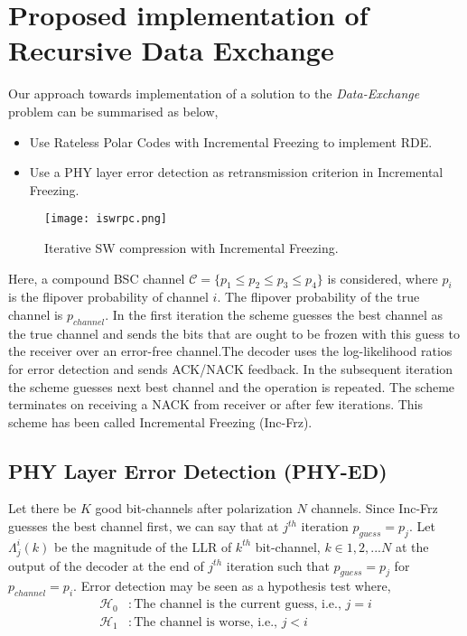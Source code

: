\documentclass[
11pt, %
a4paper, %
oneside, %
headinclude,footinclude, %
BCOR5mm, %
]{scrartcl}
\begin{document}
\section*{Proposed implementation of Recursive Data Exchange} \label{propsol}
Our approach towards implementation of a solution to the \emph{Data-Exchange} problem can be summarised as below, 
\begin{itemize}
\item{Use Rateless Polar Codes with Incremental Freezing to implement RDE.}
\item{Use a PHY layer error detection as retransmission criterion in Incremental Freezing.}
\end{itemize}
\begin{figure}[h]
 \begin{center}
    \texttt{[image: iswrpc.png]}
  \end{center}
  \caption{Iterative SW compression with Incremental Freezing.}
  \label{fig:iswrpc}
\end{figure} 
Here, a compound BSC channel $\mathcal{C}=\{ p_1 \leq p_2 \leq p_3 \leq p_4\}$ is considered, where $p_i$ is the flipover probability of channel $i$. The flipover probability of the true channel is $p_{channel}$.
In the first iteration the scheme guesses the best channel as the true channel and sends the bits that are ought to be frozen with this guess to the receiver over an error-free channel.The decoder uses the log-likelihood ratios for error detection and sends ACK/NACK feedback. In the subsequent iteration the scheme guesses next best channel and the operation is repeated. The scheme terminates on receiving a NACK from receiver or after few iterations. This scheme has been called Incremental Freezing (Inc-Frz).



\subsection*{PHY Layer Error Detection (PHY-ED)} 
Let there be $K$ good bit-channels after polarization $N$ channels.  
Since Inc-Frz guesses the best channel first, we can say that at $j^{th}$ iteration $p_{guess}=p_j$. 
Let $\Lambda_j^i(k)$ be the magnitude of the LLR of $k^{th}$ bit-channel, $k\in{1,2,...N}$ at the output of the decoder at the end of $j^{th}$ iteration such that $p_{guess}=p_j$ for $p_{channel}=p_i$. 
Error detection may be seen as a hypothesis test where,
\begin{align*}
\mathcal{H}_0 & :\text{The channel is the current guess, i.e., } j=i\\
\mathcal{H}_1 & :\text{The channel is worse, i.e., }j<i
\end{align*}
\end{document}
